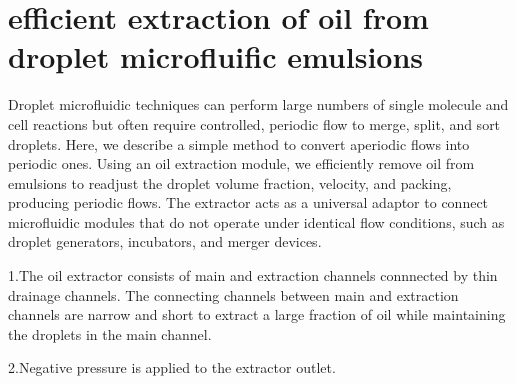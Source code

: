 \documentclass{article}
\begin{document}
\part{efficient extraction of oil from droplet microfluific emulsions}
Droplet microfluidic techniques can perform large numbers of single molecule and cell reactions but often require controlled, periodic flow to merge, split, and sort droplets. Here, we describe a simple method to convert aperiodic flows into periodic ones. Using an oil extraction module, we efficiently remove oil from emulsions to readjust the droplet volume fraction, velocity, and packing, producing periodic flows. The extractor acts as a universal adaptor to connect microfluidic modules that do not operate under identical flow conditions, such as droplet generators, incubators, and merger devices.

1.The oil extractor consists of main and extraction channels connnected by thin drainage channels. The connecting channels between main and extraction channels are narrow and short to extract a large fraction of oil while maintaining the droplets in the main channel.

2.Negative pressure is applied to the extractor outlet.
\end{document}
